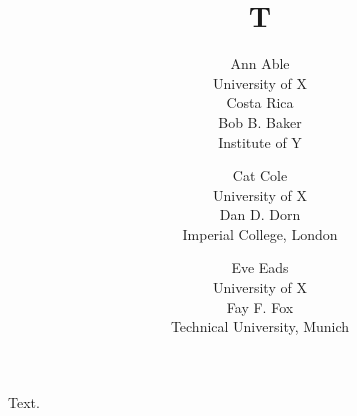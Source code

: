 \documentclass{article}
\title{T}
\author{Ann Able \\
University of X \\
Costa Rica \\
Bob B. Baker \\
Institute of Y
\and Cat Cole \\
University of X \\
Dan D. Dorn \\
Imperial College, London
\and Eve Eads \\
University of X \\
Fay F. Fox \\
Technical University, Munich}
\begin{document}
\maketitle
Text.
\end{document}
